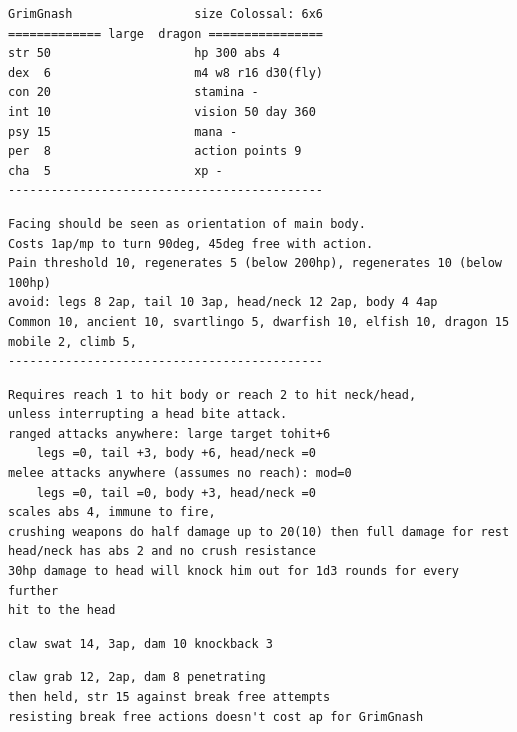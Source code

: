 \goodbreak \small \begin{samepage} \begin{verbatim}
GrimGnash                 size Colossal: 6x6
============= large  dragon ================
str 50                    hp 300 abs 4
dex  6                    m4 w8 r16 d30(fly)
con 20                    stamina -
int 10                    vision 50 day 360
psy 15                    mana -
per  8                    action points 9
cha  5                    xp -
--------------------------------------------
\end{verbatim} \end{samepage} \goodbreak \begin{samepage} \begin{verbatim}
Facing should be seen as orientation of main body.
Costs 1ap/mp to turn 90deg, 45deg free with action.
Pain threshold 10, regenerates 5 (below 200hp), regenerates 10 (below 100hp)
avoid: legs 8 2ap, tail 10 3ap, head/neck 12 2ap, body 4 4ap
Common 10, ancient 10, svartlingo 5, dwarfish 10, elfish 10, dragon 15
mobile 2, climb 5, 
--------------------------------------------
\end{verbatim} \end{samepage} \goodbreak \begin{samepage} \begin{verbatim}
Requires reach 1 to hit body or reach 2 to hit neck/head,
unless interrupting a head bite attack.
ranged attacks anywhere: large target tohit+6
    legs =0, tail +3, body +6, head/neck =0
melee attacks anywhere (assumes no reach): mod=0
    legs =0, tail =0, body +3, head/neck =0
scales abs 4, immune to fire, 
crushing weapons do half damage up to 20(10) then full damage for rest
head/neck has abs 2 and no crush resistance
30hp damage to head will knock him out for 1d3 rounds for every further
hit to the head

\end{verbatim} \end{samepage} \goodbreak \begin{samepage} \begin{verbatim}
claw swat 14, 3ap, dam 10 knockback 3

\end{verbatim} \end{samepage} \goodbreak \begin{samepage} \begin{verbatim}
claw grab 12, 2ap, dam 8 penetrating
then held, str 15 against break free attempts
resisting break free actions doesn't cost ap for GrimGnash


\end{verbatim}
\end{samepage}
